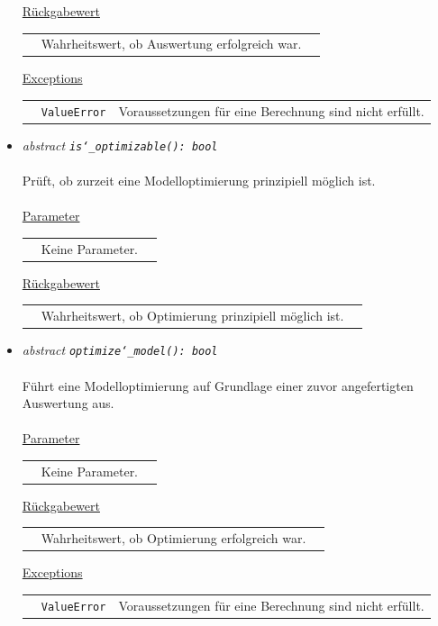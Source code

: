 \documentclass{article}
\begin{document}
\begin{itemize}
\underline{Rückgabewert}\\
\begin{tabular}{lll}
 & Wahrheitswert, ob Auswertung erfolgreich war.\\
\end{tabular}

\underline{Exceptions}\\
\begin{tabular}{lll}
 & \texttt{ValueError} & Voraussetzungen für eine Berechnung sind nicht erfüllt.\\
\end{tabular}


\item \textit{\flqq{}abstract\frqq} \texttt{\textit{is\char`_optimizable(): bool}}\\\\
Prüft, ob zurzeit eine Modelloptimierung prinzipiell möglich ist.\\\\
\underline{Parameter}\\
\begin{tabular}{lll}
 & Keine Parameter.
\end{tabular}

\underline{Rückgabewert}\\
\begin{tabular}{lll}
 & Wahrheitswert, ob Optimierung prinzipiell möglich ist.\\
\end{tabular}


\item \textit{\flqq{}abstract\frqq} \texttt{\textit{optimize\char`_model(): bool}}\\\\
Führt eine Modelloptimierung auf Grundlage einer zuvor angefertigten Auswertung aus.
\\\\
\underline{Parameter}\\
\begin{tabular}{lll}
 & Keine Parameter.\\
\end{tabular}

\underline{Rückgabewert}\\
\begin{tabular}{lll}
 & Wahrheitswert, ob Optimierung erfolgreich war.\\
\end{tabular}

\underline{Exceptions}\\
\begin{tabular}{lll}
 & \texttt{ValueError} & Voraussetzungen für eine Berechnung sind nicht erfüllt.\\
\end{tabular}



\end{itemize}
\end{document}
